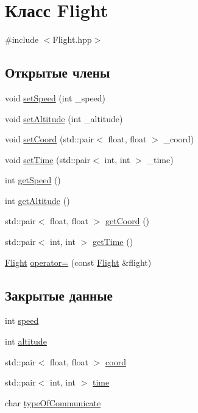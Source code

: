\hypertarget{class_flight}{}\section{Класс Flight}
\label{class_flight}


{\ttfamily \#include $<$Flight.\+hpp$>$}

\subsection*{Открытые члены}
\begin{DoxyCompactItemize}
\item 
void \hyperlink{class_flight_aa95f85724fedc5f78e3f8840f53d4a43}{set\+Speed} (int \+\_\+speed)
\item 
void \hyperlink{class_flight_a9159c2ec3f7cfdd48c57e88a4d420ade}{set\+Altitude} (int \+\_\+altitude)
\item 
void \hyperlink{class_flight_a7f61caa2255b84ed53df2d6bfb0da35d}{set\+Coord} (std\+::pair$<$ float, float $>$ \+\_\+coord)
\item 
void \hyperlink{class_flight_a3a05a47b9e4402eb7c25a08e1a74c6d8}{set\+Time} (std\+::pair$<$ int, int $>$ \+\_\+time)
\item 
int \hyperlink{class_flight_a20921ad6e50e306377d3f7ff76798aa9}{get\+Speed} ()
\item 
int \hyperlink{class_flight_a7ea3f22c73222be31966622f139c3420}{get\+Altitude} ()
\item 
std\+::pair$<$ float, float $>$ \hyperlink{class_flight_a578e4f8b9001ee730509c7b981ad1c42}{get\+Coord} ()
\item 
std\+::pair$<$ int, int $>$ \hyperlink{class_flight_a05d044e7295906e9757158bba288d789}{get\+Time} ()
\item 
\hyperlink{class_flight}{Flight} \hyperlink{class_flight_aaddfa3d524119d9ec733f95ebfd456d6}{operator=} (const \hyperlink{class_flight}{Flight} \&flight)
\end{DoxyCompactItemize}
\subsection*{Закрытые данные}
\begin{DoxyCompactItemize}
\item 
int \hyperlink{class_flight_a65b5d5c131af956b5917873f13e46482}{speed}
\item 
int \hyperlink{class_flight_ac7a47c2d1bdfb2f6c9011dfb6c4056f7}{altitude}
\item 
std\+::pair$<$ float, float $>$ \hyperlink{class_flight_a2c3404616074d0548de4f73bd953b41f}{coord}
\item 
std\+::pair$<$ int, int $>$ \hyperlink{class_flight_aee68d4d120582ca40f099b98401226ca}{time}
\item 
char \hyperlink{class_flight_a341b420c6d94c008843d766568b741db}{type\+Of\+Communicate}
\end{DoxyCompactItemize}
